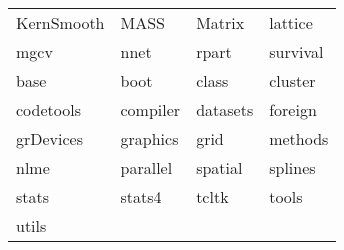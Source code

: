 \begin{tabular}{llll} 
KernSmooth & MASS & Matrix & lattice\\ 
mgcv & nnet & rpart & survival\\ 
base & boot & class & cluster\\ 
codetools & compiler & datasets & foreign\\ 
grDevices & graphics & grid & methods\\ 
nlme & parallel & spatial & splines\\ 
stats & stats4 & tcltk & tools\\ 
utils  &   &   \\ 
\end{tabular}
